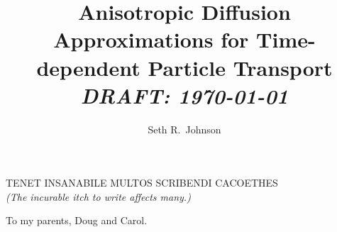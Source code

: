 \documentclass[twoside]{umthesis}
\author{Seth R.~Johnson}
\title{Anisotropic Diffusion Approximations for Time-dependent Particle
Transport%
\texorpdfstring{\\%
  \emph{DRAFT: \today}}{}
}
\begin{document}
\allowdisplaybreaks
\setlength{\parskip}{0pt plus 0pt minus 0pt}

\frontmatter

\maketitle


\begin{frontispiece}
\centering
TENET INSANABILE MULTOS SCRIBENDI CACOETHES
\\
{\small \itshape (The incurable itch to write affects many.)}
\end{frontispiece}
  


\begin{dedication}
  To my parents, Doug and Carol.
\end{dedication}

\end{document}
